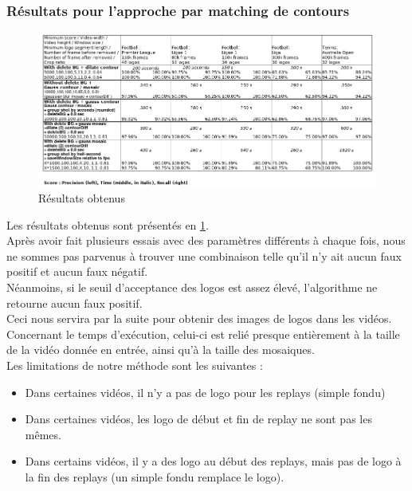 \documentclass[11pt]{article}
\begin{document}
\subsubsection{Résultats pour l'approche par matching de contours}
\label{sec:org757bf25}
\begin{figure}[htbp]
\centering
\includegraphics[width=17cm]{res_match_contour.png}
\caption{Résultats obtenus \label{res-match-contour}}
\end{figure}
Les résultats obtenus sont présentés en \ref{res-match-contour}.\\

Après avoir fait plusieurs essais avec des paramètres différents à chaque fois, nous ne sommes pas parvenus à trouver une combinaison telle qu'il n'y ait aucun faux positif et aucun faux négatif.\\
Néanmoins, si le seuil d'acceptance des logos est assez élevé, l'algorithme ne retourne aucun faux positif.\\
Ceci nous servira par la suite pour obtenir des images de logos dans les vidéos.\\

Concernant le temps d’exécution, celui-ci est relié presque entièrement à la taille de la vidéo donnée en entrée, ainsi qu’à la taille des mosaiques.\\

Les limitations de notre méthode sont les suivantes :\\
\begin{itemize}
\item Dans certaines vidéos, il n’y a pas de logo pour les replays (simple fondu)\\
\item Dans certaines vidéos, les logo de début et fin de replay ne sont pas les mêmes.\\
\item Dans certains vidéos, il y a des logo au début des replays, mais pas de logo à la fin des replays (un simple fondu remplace le logo).\\
\end{itemize}
\end{document}
